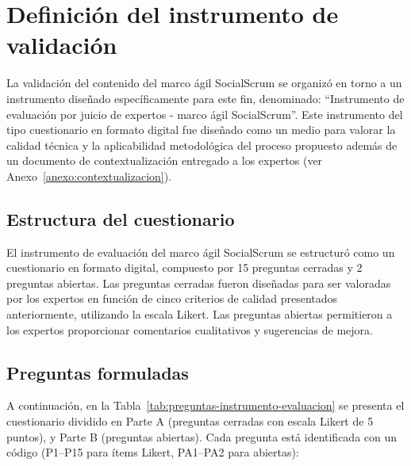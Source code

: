 \section{Definición del instrumento de validación}
La validación del contenido del marco ágil SocialScrum se organizó en torno a un instrumento diseñado específicamente para este fin, denominado: ``Instrumento de evaluación por juicio de expertos - marco ágil SocialScrum''. Este instrumento del tipo cuestionario en formato digital fue diseñado como un medio para valorar la calidad técnica y la aplicabilidad metodológica del proceso propuesto además de un documento de contextualización entregado a los expertos (ver Anexo~\ref{anexo:contextualizacion}).

\subsection{Estructura del cuestionario}
El instrumento de evaluación del marco ágil SocialScrum se estructuró como un cuestionario en formato digital, compuesto por 15 preguntas cerradas y 2 preguntas abiertas. Las
preguntas cerradas fueron diseñadas para ser valoradas por los expertos en función de cinco criterios de calidad presentados anteriormente, utilizando la escala Likert. Las preguntas abiertas permitieron a los expertos proporcionar comentarios cualitativos y sugerencias de mejora.

\subsection{Preguntas formuladas}
A continuación, en la Tabla~\ref{tab:preguntas-instrumento-evaluacion} se presenta el cuestionario dividido en Parte A (preguntas cerradas con escala Likert de 5 puntos),  y Parte B (preguntas abiertas). Cada pregunta está identificada con un código (P1–P15 para ítems Likert, PA1–PA2 para abiertas):

\begingroup
\scriptsize
\renewcommand{\arraystretch}{1.4}
\setlength{\tabcolsep}{4pt}
\setlength{\LTleft}{0pt}
\setlength{\LTright}{0pt}

